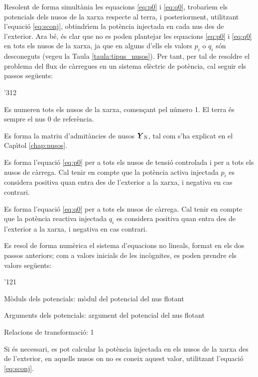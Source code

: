 Resolent de forma simult\`{a}nia les equacions \eqref{eq:p0} i
\eqref{eq:q0}, trobar\'{\i}em els potencials dels nusos de la xarxa
respecte al terra, i posteriorment, utilitzant l'equaci\'{o}
\eqref{eq:sconj}, obtindr\'{\i}em la pot\`{e}ncia injectada en cada nus des
de l'exterior. Ara b\'{e}, \'{e}s clar que no es poden plantejar les
equacions \eqref{eq:p0} i \eqref{eq:q0} en tots els nusos de la
xarxa, ja que en alguns d'ells els valors $p_i$ o $q_i$ s\'{o}n
desconeguts (vegeu la Taula \vref{taula:tipus_nusos}). Per tant, per
tal de resoldre el problema del flux de c\`{a}rregues en un sistema
el\`{e}ctric de pot\`{e}ncia, cal seguir els passos seg\"{u}ents:
\begin{dingautolist}{'312}
    \item Es numeren tots els nusos de la xarxa, comen\c{c}ant pel n\'{u}mero 1. El terra \'{e}s sempre el nus 0 de refer\`{e}ncia.
   \item Es forma la matriu d'admit\`{a}ncies de nusos $\mcmplx{Y}\ped{N}$, tal com s'ha
   explicat en el Cap\'{\i}tol \ref{chap:nusos}.
   \item Es forma l'equaci\'{o} \eqref{eq:p0} per a tots els nusos de tensi\'{o} controlada i per
   a tots els nusos de c\`{a}rrega. Cal tenir en compte que la pot\`{e}ncia activa  injectada $p_i$ es considera
   positiva quan entra des de l'exterior a la xarxa, i negativa en cas contrari.
   \item Es forma l'equaci\'{o} \eqref{eq:q0} per a tots els nusos de c\`{a}rrega. Cal tenir en compte
   que la pot\`{e}ncia reactiva injectada $q_i$  es considera positiva quan entra des de l'exterior a la xarxa, i negativa en cas contrari.
   \item Es resol de forma num\`{e}rica el sistema d'equacions no lineals, format en els dos
   passos anteriors; com a valors inicials de les inc\`{o}gnites, es poden prendre els valors
   seg\"{u}ents:
   \begin{dinglist}{'121}
    \item M\`{o}duls dels potencials: m\`{o}dul del potencial del nus flotant
    \item Arguments dels potencials: argument del potencial del nus flotant
    \item Relacions de transformaci\'{o}: 1
   \end{dinglist}
   \item Si \'{e}s necessari,  es pot calcular la pot\`{e}ncia injectada en els nusos de la xarxa
   des de l'exterior, en aquells nusos on no es
   coneix aquest valor, utilitzant    l'equaci\'{o} \eqref{eq:sconj}.
\end{dingautolist}

